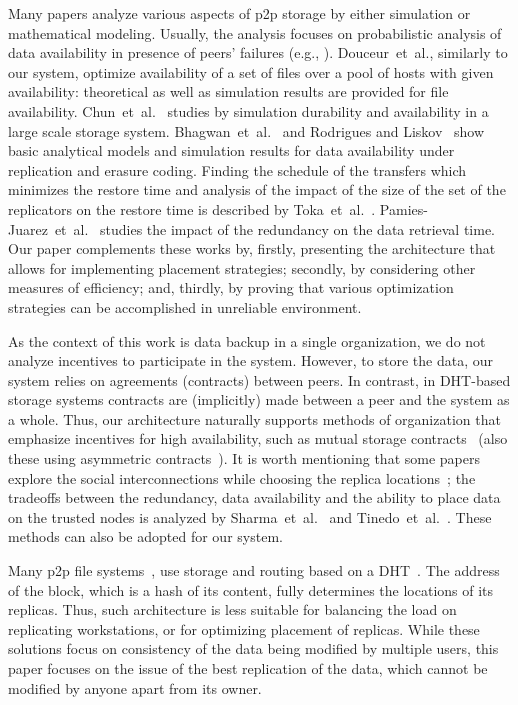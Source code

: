 \documentclass[10pt, final, conference, letterpaper]{IEEEtran}
\begin{document}
Many papers analyze various aspects of p2p storage by either simulation or mathematical modeling. 
Usually, the analysis focuses on probabilistic analysis of data availability in presence of peers' failures (e.g., \cite{Bernard2009OptimizingPeer-to-PeerBackup}). 
Douceur~et~al.\cite{douceur2001competitive}, similarly to our system, optimize availability of a set of files over a pool of hosts with given availability: theoretical as well as simulation results are provided for file availability.
Chun~et~al.~\cite{chun2006efficient} studies by simulation durability and availability in a large scale storage system. 
Bhagwan~et~al.~\cite{Bhagwan2002Replicationstrategieshighly} and Rodrigues and Liskov~\cite{rodrigues2005high} show basic analytical models and simulation results for data availability under replication and erasure coding. 
Finding the schedule of the transfers which minimizes the restore time and analysis of the impact of the size of the set of the replicators on the restore time is described by Toka~et~al.~\cite{p2pDataTransferScheduling}. Pamies-Juarez~et~al.~\cite{conf/p2p/Pamies-JuarezLA10} studies the impact of the redundancy on the data retrieval time.
Our paper complements these works by, firstly, presenting the architecture that allows for implementing placement strategies; secondly, by considering other measures of efficiency; and, thirdly, by proving that various optimization strategies can be accomplished in unreliable environment.

As the context of this work is data backup in a single organization, we do not analyze incentives to participate in the system. 
However, to store the data, our system relies on agreements (contracts) between peers.  
In contrast, in DHT-based storage systems contracts are (implicitly) made between a peer and the system as a whole.  
Thus, our architecture naturally supports methods of organization that emphasize incentives for high availability, such as mutual storage contracts~\cite{Rzadca2010ReplicaPlacementin, cox2003samsara} (also these using asymmetric contracts~\cite{conf/p2p/Pamies-JuarezLA11}).
It is worth mentioning that some papers explore the social interconnections while choosing the replica locations~\cite{friendstore}; the tradeoffs  between the redundancy, data availability and the ability to place data on the trusted nodes is analyzed  by Sharma~et~al.~\cite{friendstoreAnalysis} and Tinedo~et~al.~\cite{conf/p2p/TinedoAL12}. These methods can also be adopted for our system.

Many p2p file systems~\cite{ivyP2PFileSystem, pastisP2PFileSystem, igorFs, bitVault, bigTable}, use storage and routing based on a DHT~\cite{dHash, pastryDHT}. The address of the block, which is a hash of its content, fully determines the locations of its replicas. Thus, such architecture is less suitable for balancing the load on replicating workstations, or for optimizing placement of replicas. While these solutions focus on consistency of the data being modified by multiple users, this paper focuses on the issue of the best replication of the data, which cannot be modified by anyone apart from its owner.
\end{document}
